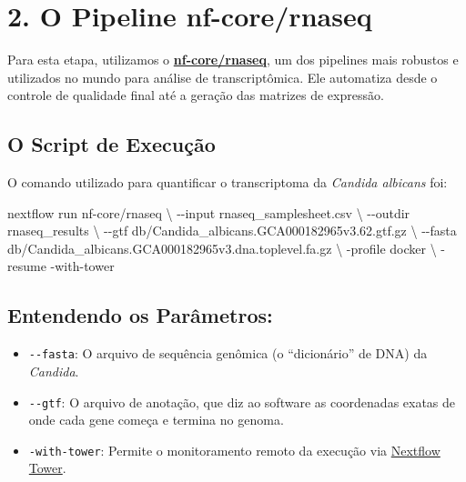 \documentclass[
  letterpaper,
  DIV=11,
  numbers=noendperiod]{scrreprt}
\newenvironment{Shaded}{\begin{snugshade}}{\end{snugshade}}
\newcommand{\AttributeTok}[1]{\textcolor[rgb]{0.40,0.45,0.13}{#1}}
\newcommand{\DataTypeTok}[1]{\textcolor[rgb]{0.68,0.00,0.00}{#1}}
\newcommand{\ExtensionTok}[1]{\textcolor[rgb]{0.00,0.23,0.31}{#1}}
\newcommand{\NormalTok}[1]{\textcolor[rgb]{0.00,0.23,0.31}{#1}}
\providecommand{\tightlist}{%
  \setlength{\itemsep}{0pt}\setlength{\parskip}{0pt}}
\begin{document}
\section{2. O Pipeline nf-core/rnaseq}\label{o-pipeline-nf-corernaseq}

Para esta etapa, utilizamos o
\href{https://nf-co.re/rnaseq}{\textbf{nf-core/rnaseq}}, um dos
pipelines mais robustos e utilizados no mundo para análise de
transcriptômica. Ele automatiza desde o controle de qualidade final até
a geração das matrizes de expressão.

\subsection{O Script de Execução}\label{o-script-de-execuuxe7uxe3o-1}

O comando utilizado para quantificar o transcriptoma da \emph{Candida
albicans} foi:

\begin{Shaded}
\begin{Highlighting}[]
\ExtensionTok{nextflow}\NormalTok{ run nf{-}core/rnaseq }\DataTypeTok{\textbackslash{}}
    \AttributeTok{{-}{-}input}\NormalTok{ rnaseq\_samplesheet.csv }\DataTypeTok{\textbackslash{}}
    \AttributeTok{{-}{-}outdir}\NormalTok{ rnaseq\_results }\DataTypeTok{\textbackslash{}}
    \AttributeTok{{-}{-}gtf}\NormalTok{ db/Candida\_albicans.GCA000182965v3.62.gtf.gz }\DataTypeTok{\textbackslash{}}
    \AttributeTok{{-}{-}fasta}\NormalTok{ db/Candida\_albicans.GCA000182965v3.dna.toplevel.fa.gz }\DataTypeTok{\textbackslash{}}
    \AttributeTok{{-}profile}\NormalTok{ docker }\DataTypeTok{\textbackslash{}}
    \AttributeTok{{-}resume} \AttributeTok{{-}with{-}tower}
\end{Highlighting}
\end{Shaded}

\subsection{Entendendo os
Parâmetros:}\label{entendendo-os-paruxe2metros-1}

\begin{itemize}
\tightlist
\item
  \texttt{-\/-fasta}: O arquivo de sequência genômica (o ``dicionário''
  de DNA) da \emph{Candida}.
\item
  \texttt{-\/-gtf}: O arquivo de anotação, que diz ao software as
  coordenadas exatas de onde cada gene começa e termina no genoma.
\item
  \texttt{-with-tower}: Permite o monitoramento remoto da execução via
  \href{https://tower.nf/}{Nextflow Tower}.
\end{itemize}
\end{document}
